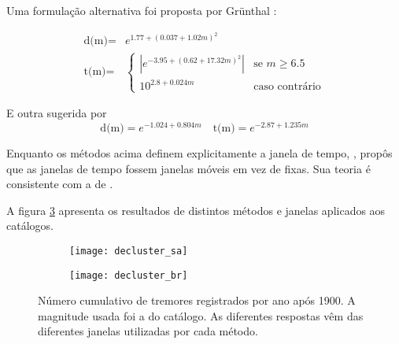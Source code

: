 Uma formulação alternativa foi proposta por Gr\"unthal \citep{marsan_david_2012} :

\begin{equation}\begin{split} 
\mbox{d(m)} = & e^{1.77 + \left( {0.037 + 1.02 m} \right)^2} \\ 
   \mbox{t(m)} = & \begin{cases}   |e^{-3.95+ \left( {0.62 + 17.32 m}
    \right)^2}|    & \text{se $m \geq 6.5$ } \\ 10^{2.8 + 0.024 m} & 
    \text{caso contrário}  \end{cases}\end{split}
\end{equation}

E outra sugerida por \citet{uhrhammer_1986}
%
\begin{equation}
\mbox{d(m)} = e^{-1.024 + 0.804 m} \quad \mbox{t(m)} = 
    e^{-2.87 + 1.235 m}
\end{equation}

Enquanto os métodos acima definem explicitamente a janela de tempo, \citet{musson_1999}, propôs que as janelas de tempo
fossem janelas móveis em vez de fixas. Sua teoria é consistente com a de \citet{gardner_1974}.

A figura \ref{fig:eq_decluster_cum} apresenta os resultados de distintos métodos e janelas aplicados aos 
catálogos.

\begin{figure}[H]
	\centering
	\begin{subfigure}[b]{0.48\textwidth}
		  	\centering
			\texttt{[image: decluster\_sa]}
			\label{fig:sa_eq_record}
	\end{subfigure}%
	\quad %
	\begin{subfigure}[b]{0.48\textwidth}
		  	\centering
			\texttt{[image: decluster\_br]}
			\label{fig:br_eq_record}
    \end{subfigure}%
	\caption{Número cumulativo de tremores registrados por ano após 1900. A magnitude usada foi a do catálogo. 
	As diferentes respostas vêm das diferentes janelas utilizadas por cada método.}
	\label{fig:eq_decluster_cum}
\end{figure}

